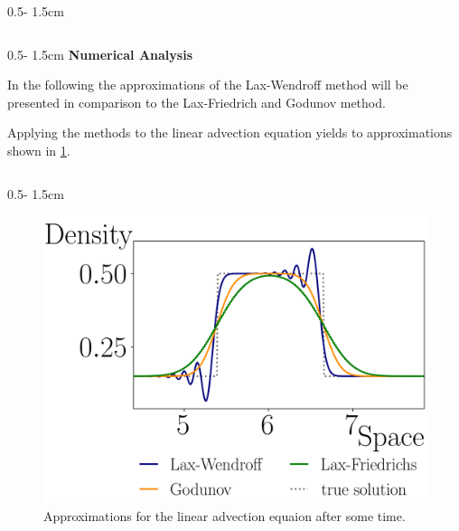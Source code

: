 \documentclass{uibposter}
\begin{document}
\begin{frame}[fragile]
\begin{columns}
\begin{column}{0.5\textwidth - 1.5cm}
\begin{column}{0.5\textwidth - 1.5cm}
\vspace{0.5cm}
\textbf{Numerical Analysis}
\vspace{0.5cm}
    
In the following the approximations of the Lax-Wendroff method will be presented in comparison to the Lax-Friedrich and Godunov method.

\vspace{0.5cm}
Applying the methods to the linear advection equation yields to approximations shown in \cref{img:linar_comprehension}.
    
\end{column}
\begin{column}{0.5\textwidth - 1.5cm}
\vspace*{-1.5cm}

    \vspace{1.5cm}
    
    \begin{figure}
    	\includegraphics{fig/linear_compare.png}
    	\caption{Approximations for the linear advection equaion after some time.}
    	\label{img:linar_comprehension}
    \end{figure}
    

\end{column}
\end{column}
\end{columns}
\end{frame}
\end{document}
